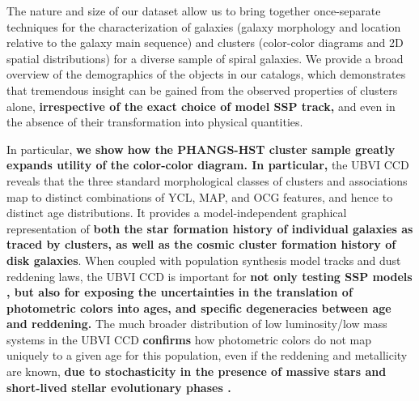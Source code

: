 \documentclass[linenumbers]{aastex63}
\begin{document}
The nature and size of our dataset allow us to bring together once-separate techniques for the characterization of galaxies (galaxy morphology and location relative to the galaxy main sequence) and clusters (color-color diagrams and 2D spatial distributions) for a diverse sample of spiral galaxies.  We provide a broad overview of the demographics of the objects in our catalogs, which demonstrates that tremendous insight can be gained from the observed properties of clusters alone, \textbf{irrespective of the exact choice of model SSP track,} and even in the absence of their transformation into physical quantities.  

In particular, \textbf{we show how the PHANGS-HST cluster sample greatly expands utility of the color-color diagram.  In particular,} the UBVI CCD reveals that the three standard morphological classes of clusters and associations map to distinct combinations of YCL, MAP, and OCG features, and hence to distinct age distributions.  It provides a model-independent graphical representation of \textbf{both the star formation history of individual galaxies as traced by clusters, as well as the cosmic cluster formation history of disk galaxies}.  When coupled with population synthesis model tracks and dust reddening laws, the UBVI CCD is important for \textbf{not only testing SSP models \textbf{\citep[e.g.,][]{larsen_young_1999, bruzual_stellar_2003, vazquez_optimization_2005, maraston_evolutionary_1998}}, but also for exposing the uncertainties in the translation of photometric colors into ages, and specific degeneracies between age and reddening.}   The much broader distribution of low luminosity/low mass systems in the UBVI CCD \textbf{confirms} how photometric colors do not map uniquely to a given age for this population, even if the reddening and metallicity are known, \textbf{due to stochasticity in the presence of massive stars and short-lived stellar evolutionary phases \citep[e.g.][]{fouesneau_accounting_2010, silva-villa_star_2011,de_meulenaer_deriving_2013,krumholz_star_2015, OD2022}.}
\end{document}
